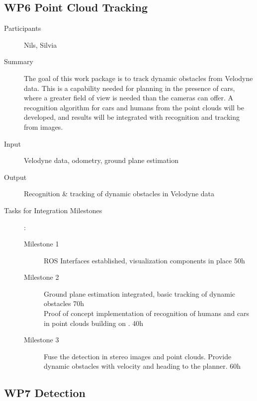 \documentclass[11pt,a4paper]{article}
\begin{document}
\subsection{WP6 Point Cloud Tracking}

\begin{description}
\item[Participants] Nils, Silvia
\item[Summary] The goal of this work package is to track dynamic obstacles from Velodyne data.
			   This is a capability needed for planning in the presence of cars, where a greater field of view is needed than the cameras can offer.
			   A recognition algorithm for cars and humans from the point clouds will be developed,
			   and results will be integrated with recognition and tracking from images.
\item[Input] Velodyne data, odometry, ground plane estimation
\item[Output] Recognition \& tracking of dynamic obstacles in Velodyne data
\item[Tasks for Integration Milestones]:\
	\begin{description}
		\item[Milestone 1] ROS Interfaces established, visualization components in place 50h
		\item[Milestone 2] Ground plane estimation integrated, basic tracking of dynamic obstacles 70h\\
		
						   Proof of concept implementation of recognition of humans and cars in point clouds building on \cite{wang2015voting}. 40h
		\item[Milestone 3] Fuse the detection in stereo images and point clouds. Provide dynamic obstacles
						   with velocity and heading to the planner. 60h
	\end{description}	 
\end{description}

\subsection{WP7 Detection} %
\end{document}
